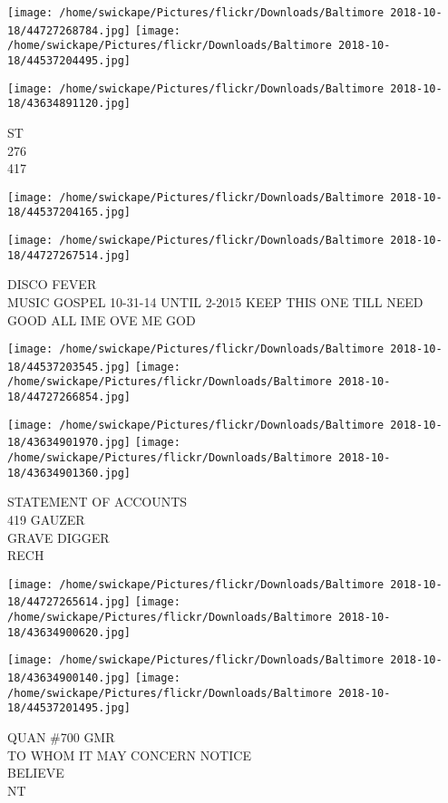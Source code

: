 \documentclass[10pt,letterpaper]{article}
\begin{document}
\texttt{[image: /home/swickape/Pictures/flickr/Downloads/Baltimore 2018-10-18/44727268784.jpg]}
\texttt{[image: /home/swickape/Pictures/flickr/Downloads/Baltimore 2018-10-18/44537204495.jpg]}

\vspace{0.25in}
\texttt{[image: /home/swickape/Pictures/flickr/Downloads/Baltimore 2018-10-18/43634891120.jpg]}

ST\\
276\\
417
\pagebreak

\texttt{[image: /home/swickape/Pictures/flickr/Downloads/Baltimore 2018-10-18/44537204165.jpg]}

\vspace{0.25in}
\texttt{[image: /home/swickape/Pictures/flickr/Downloads/Baltimore 2018-10-18/44727267514.jpg]}

DISCO FEVER\\
MUSIC GOSPEL 10{-}31{-}14 UNTIL 2{-}2015 KEEP THIS ONE TILL NEED GOOD ALL IME OVE ME GOD
\pagebreak

\texttt{[image: /home/swickape/Pictures/flickr/Downloads/Baltimore 2018-10-18/44537203545.jpg]}
\texttt{[image: /home/swickape/Pictures/flickr/Downloads/Baltimore 2018-10-18/44727266854.jpg]}

\texttt{[image: /home/swickape/Pictures/flickr/Downloads/Baltimore 2018-10-18/43634901970.jpg]}
\texttt{[image: /home/swickape/Pictures/flickr/Downloads/Baltimore 2018-10-18/43634901360.jpg]}

STATEMENT OF ACCOUNTS\\
419 GAUZER\\
GRAVE DIGGER\\
RECH
\pagebreak

\texttt{[image: /home/swickape/Pictures/flickr/Downloads/Baltimore 2018-10-18/44727265614.jpg]}
\texttt{[image: /home/swickape/Pictures/flickr/Downloads/Baltimore 2018-10-18/43634900620.jpg]}

\texttt{[image: /home/swickape/Pictures/flickr/Downloads/Baltimore 2018-10-18/43634900140.jpg]}
\texttt{[image: /home/swickape/Pictures/flickr/Downloads/Baltimore 2018-10-18/44537201495.jpg]}

QUAN \#700 GMR\\
TO WHOM IT MAY CONCERN NOTICE\\
BELIEVE\\
NT
\pagebreak
\end{document}
